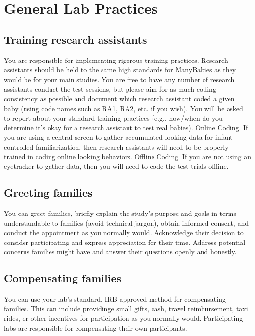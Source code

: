 \documentclass[
]{book}
\begin{document}
\chapter{General Lab Practices}\label{general-lab-practices-1}

\section{Training research assistants}\label{training-research-assistants-1}

You are responsible for implementing rigorous training practices. Research assistants should be held to the same high standards for ManyBabies as they would be for your main studies. You are free to have any number of research assistants conduct the test sessions, but please aim for as much coding consistency as possible and document which research assistant coded a given baby (using code names such as RA1, RA2, etc. if you wish). You will be asked to report about your standard training practices (e.g., how/when do you determine it's okay for a research assistant to test real babies).
Online Coding. If you are using a central screen to gather accumulated looking data for infant-controlled familiarization, then research assistants will need to be properly trained in coding online looking behaviors.
Offline Coding. If you are not using an eyetracker to gather data, then you will need to code the test trials offline.

\section{Greeting families}\label{greeting-families}

You can greet families, briefly explain the study's purpose and goals in terms understandable to families (avoid technical jargon), obtain informed consent, and conduct the appointment as you normally would. Acknowledge their decision to consider participating and express appreciation for their time. Address potential concerns families might have and answer their questions openly and honestly.

\section{Compensating families}\label{compensating-families-1}

You can use your lab's standard, IRB-approved method for compensating families. This can include providinge small gifts, cash, travel reimbursement, taxi rides, or other incentives for participation as you normally would. Participating labs are responsible for compensating their own participants.
\end{document}
